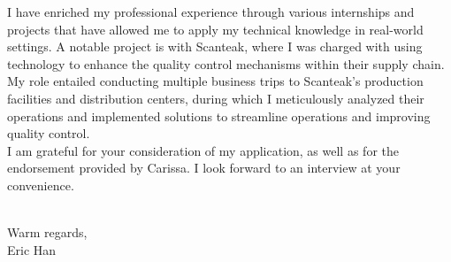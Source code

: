 \documentclass[11pt, a4paper]{article}
\begin{document}
\begin{minipage}[t]{0.95\textwidth}
{  I have enriched my professional experience through various internships and projects that have allowed me to apply my technical knowledge in real-world settings.
  A notable project is with Scanteak, where I was charged with using technology to enhance the quality control mechanisms within their supply chain. 
  My role entailed conducting multiple business trips to Scanteak's production facilities and distribution centers, 
  during which I meticulously analyzed their operations and implemented solutions to streamline operations and improving quality control.
  \\[.5em]
  I am grateful for your consideration of my application, as well as for the endorsement provided by Carissa.
  I look forward to an interview at your convenience.
}\end{minipage}\\[1em]

Warm regards,\\
Eric Han\\
\end{document}
